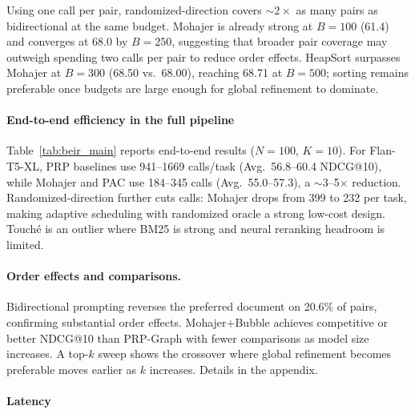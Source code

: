 \documentclass{llmxive}
\begin{document}
Using one call per pair, randomized-direction covers $\sim$$2\times$ as many pairs as bidirectional at the same budget.
Mohajer is already strong at $B{=}100$ (61.4) and converges at 68.0 by $B{=}250$, suggesting that broader pair coverage may outweigh spending two calls per pair to reduce order effects.
HeapSort surpasses Mohajer at $B{=}300$ (68.50 vs.\ 68.00), reaching 68.71 at $B{=}500$; sorting remains preferable once budgets are large enough for global refinement to dominate.

\vspace{-0.2cm}
\paragraph{End-to-end efficiency in the full pipeline}
\label{sec:end_to_end}

Table~\ref{tab:beir_main} reports end-to-end results ($N{=}100$, $K{=}10$). For Flan-T5-XL, PRP baselines use 941--1669 calls/task (Avg.\ 56.8--60.4 NDCG@10), while Mohajer and PAC use 184--345 calls (Avg.\ 55.0--57.3), a $\sim$3--5$\times$ reduction.
Randomized-direction further cuts calls: Mohajer drops from 399 to 232 per task, making adaptive scheduling with randomized oracle a strong low-cost design.
Touché is an outlier where BM25 is strong and neural reranking headroom is limited.

\vspace{-0.2cm}
\paragraph{Order effects and comparisons.}
Bidirectional prompting reverses the preferred document on 20.6\% of pairs, confirming substantial order effects.
Mohajer+Bubble achieves competitive or better NDCG@10 than PRP-Graph with fewer comparisons as model size increases.
A top-$k$ sweep shows the crossover where global refinement becomes preferable moves earlier as $k$ increases. Details in the appendix.




\vspace{-0.2cm}
\paragraph{Latency}
\label{sec:latency}
\end{document}
